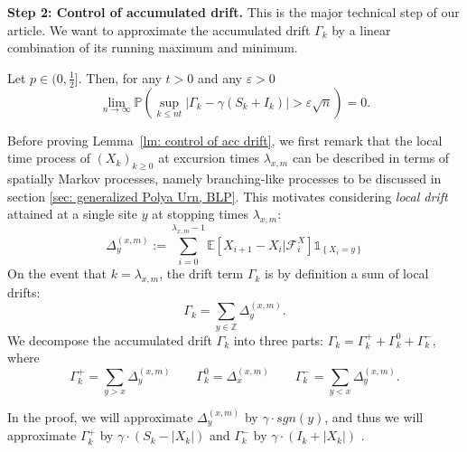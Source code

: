 \documentclass[EJP]{ejpecp} %
\newcommand{\abs}[1]{\left\vert #1 \right\vert}
\begin{document}
\textbf{Step 2: Control of accumulated drift.} This is the major technical step of our article. We want to approximate the accumulated drift $\Gamma_k$ by a linear combination of its running maximum and minimum.
\begin{lemma}\label{lm: control of acc drift}
	Let $p\in (0,\frac{1}{2}]$. Then, for any $t>0$ and any $\varepsilon >0$
	\begin{equation}\label{eq: control of acc drift}
		\lim_{n \to \infty }\mathbb{P}\left(\sup_{k\leq nt} \abs{\Gamma_k - \gamma \left(S_k + I_k \right)   } > \varepsilon \sqrt{n}  \right) =0. 
	\end{equation}
\end{lemma}
Before proving Lemma~\ref{lm: control of acc drift}, we first remark that the local time process of $(X_k)_{k \ge 0}$ at excursion times $\lambda_{x,m}$ can be described in terms of spatially Markov processes, namely branching-like processes to be discussed in section \ref{sec: generalized Polya Urn, BLP}. This motivates considering \textit{local drift} attained at a single site $y$ at stopping times $\lambda_{x, m}$:
\begin{equation}\label{eq: accumulated local drift}
	\Delta_y^{(x,m)}:= \sum_{i=0}^{\lambda_{x,m}-1} \mathbb{E}\left[X_{i+1}-X_i\vert \mathcal{F}_{i}^X\right] \mathbb{1}_{\left\{X_i=y\right\}}
\end{equation}
On the event that $k = \lambda_{x,m}$, the drift term $\Gamma_k$ is by definition a sum of local drifts:
\begin{equation}\label{eq: drift in terms of local drifts}
	\Gamma_k = \sum_{y\in \mathbb{Z}} \Delta_y^{(x,m)}
	.\end{equation}
We decompose the accumulated drift $\Gamma_k$ into three parts: $\Gamma_k = 	\Gamma_k^+ +	\Gamma_k^0 + \Gamma_k^-$, where 
\[
\Gamma_k^{+} = \sum_{y > x} \Delta_y^{(x,m)}\qquad 
\Gamma_k^{0} = \Delta_x^{(x,m)} \qquad
\Gamma_k^{-} = \sum_{y < x} \Delta_y^{(x,m)}
.\]
\iffalse
\begin{align*}
	\Gamma_k^{+ \phantom{0}} &= \sum_{y > x} \Delta_y^{(x,m)}\\
	\Gamma_k^{0 \phantom{+}} &= \Delta_x^{(x,m)} \\[0.6em]
	\Gamma_k^{- \phantom{0}} &= \sum_{y < x} \Delta_{y}^{(x,m)}
	.\end{align*} 
\fi
In the proof, we will approximate $\Delta_y^{(x,m)}$ by $\gamma\cdot sgn(y)$, and thus we will approximate $\Gamma_k^+$ by $\gamma \cdot (S_k - \abs{X_k})$ and $\Gamma_k^-$ by $ \gamma \cdot (I_k + \abs{X_k} )$
.
\end{document}
